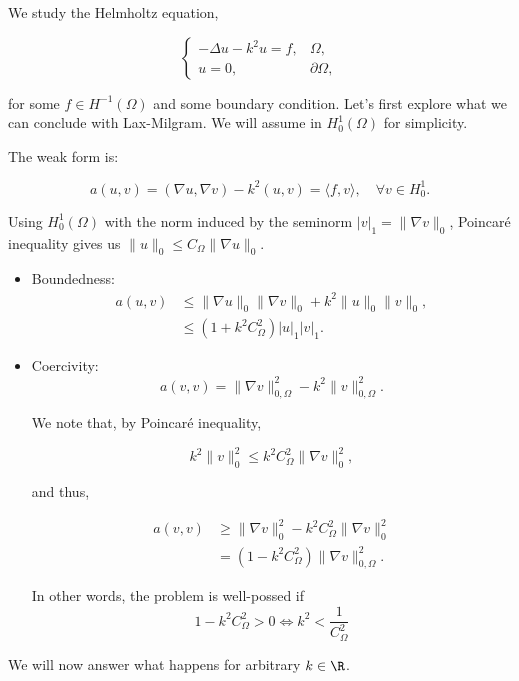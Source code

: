 
We study the Helmholtz equation,

\[
\left\{
\begin{array}{rc}
    -\Delta u -k^2 u = f, &\Omega,\\
    u=0, &\partial\Omega,
\end{array}\right.
\]

for some $f\in H^{-1}(\Omega)$ and some boundary condition. Let's first explore what we can conclude with Lax-Milgram. 
We will assume in $H_0^1(\Omega)$ for simplicity.

The weak form is:

\[
a(u,v) = (\nabla u, \nabla v) - k^2(u,v) = \langle f, v\rangle, \quad \forall v\in H_0^1.
\]

Using $H_0^1(\Omega)$ with the norm induced by the seminorm $|v|_1 = \|\nabla v\|_0$, Poincaré inequality gives us $\|u\|_0\leq C_{\Omega}\|\nabla u\|_0$. 

\begin{itemize}
    \item Boundedness: 
    \begin{align*}
        a(u,v) &\leq \|\nabla u\|_0\|\nabla v\|_0 + k^2\|u\|_0\|v\|_0,\\ 
        &\leq (1+k^2C_\Omega^2)|u|_1|v|_1.
    \end{align*}

    \item Coercivity: 
    \begin{equation*}
        a(v,v) = \|\nabla v\|^2_{0,\Omega} - k^2\|v\|^2_{0,\Omega}.
    \end{equation*}

    We note that, by Poincaré inequality,

    \[ k^2\|v\|^2_0 \leq k^2 C^2_{\Omega}\|\nabla v\|^2_0, \]

    and thus,

    \begin{align*}
        a(v,v) &\geq \|\nabla v\|^2_0 - k^2C_\Omega^2\|\nabla v\|^2_0 \\
        &= (1- k^2 C_\Omega^2)\|\nabla v\|^2_{0,\Omega}.
    \end{align*}

    In other words, the problem is well-possed if 
    $$1-k^2C_\Omega^2 > 0 \iff k^2 < \frac{1}{C_\Omega^2}$$
\end{itemize}

We will now answer what happens for arbitrary $k\in\R$.

